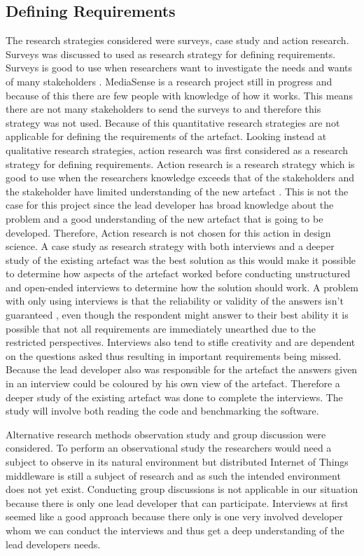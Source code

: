 \subsection{Defining Requirements}
The research strategies considered were surveys, case study and action research. Surveys was discussed to used as research strategy for defining requirements. Surveys is good to use when researchers want to investigate the needs and wants of many stakeholders \cite{johannesson2012design}. MediaSense is a research project still in progress and because of this there are few people with knowledge of how it works. This means there are not many stakeholders to send the surveys to and therefore this strategy was not used. Because of this quantitative research strategies are not applicable for defining the requirements of the artefact. 
Looking instead at qualitative research strategies, action research was first considered as a research strategy for defining requirements. Action research is a research strategy which is good to use when the researchers knowledge exceeds that of the stakeholders and the stakeholder have limited understanding of the new artefact \cite{johannesson2012design}. This is not the case for this project since the lead developer has broad knowledge about the problem and a good understanding of the new artefact that is going to be developed. Therefore, Action research is not chosen for this action in design science. 
A case study as research strategy with both interviews and a deeper study of the existing artefact was the best solution as this would make it possible to determine how aspects of the artefact worked before conducting unstructured and open-ended interviews to determine how the solution should work. A problem with only using  interviews is that the reliability or validity of the answers isn't guaranteed \cite{golafshani2003understanding}, even though the respondent might answer to their best ability it is possible that not all requirements are immediately unearthed due to the restricted perspectives. Interviews also tend to stifle creativity and are dependent on the questions asked \cite{johannesson2012design} thus resulting in important requirements being missed. Because the lead developer also was responsible for the artefact the answers given in an interview could be coloured by his own view of the artefact. Therefore a deeper study of the existing artefact was done to complete the interviews. The study will involve both reading the code and benchmarking the software.

Alternative research methods observation study and group discussion were considered. To perform an observational study the researchers would need a subject to observe in its natural environment but distributed Internet of Things middleware is still a subject of research and as such the intended environment does not yet exist. Conducting group discussions is not applicable in our situation because there is only one lead developer that can participate. 
Interviews at first seemed like a good approach because there only is one very involved developer whom we can conduct the interviews and thus get a deep understanding of the lead developers needs. 

